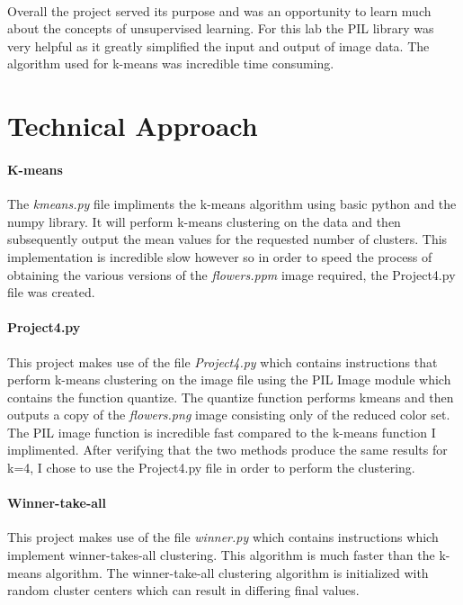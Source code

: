 \documentclass{article}
\begin{document}
\paragraph{} 
Overall the project served its purpose and was an opportunity to learn
much about the concepts of unsupervised learning. For this lab the 
PIL library was very helpful as it greatly simplified the input and output
of image data. The algorithm used for k-means was incredible time consuming.
\newpage


\section*{Technical Approach}
\paragraph{K-means} 
The \textit{kmeans.py} file impliments the k-means algorithm using basic
python and the numpy library. It will perform k-means clustering on the 
data and then subsequently output the mean values for the requested number
of clusters. This implementation is incredible slow however so in order to
speed the process of obtaining the various versions of the \textit{flowers.ppm}
image required, the Project4.py file was created. 

\paragraph{Project4.py}
This project makes use of the file \textit{Project4.py} which contains 
instructions that perform k-means clustering on the image file using 
the PIL Image module which contains the function quantize. The quantize
function performs kmeans and then outputs a copy of the \textit{flowers.png} 
image consisting only of the reduced color set. The PIL image function is 
incredible fast compared to the k-means function I implimented. After verifying
that the two methods produce the same results for k=4, I chose to use the 
Project4.py file in order to perform the clustering.

\paragraph{Winner-take-all}
This project makes use of the file \textit{winner.py} which contains instructions
which implement winner-takes-all clustering. This algorithm is much faster than the
k-means algorithm. The winner-take-all clustering algorithm is initialized with random
cluster centers which can result in differing final values.
\end{document}
